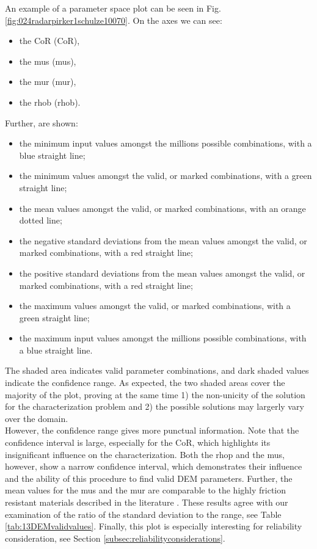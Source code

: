 An example of a parameter space plot can be seen
in Fig. \ref{fig:024radarpirker1schulze10070}.
On the axes we can see:
\begin{itemize}
  \item{the \acl{CoR} (\acs{CoR}),}
  \item{the \acl{mus} (\acs{mus}),}
  \item{the \acl{mur} (\acs{mur}),}  
  \item{the \acl{rhob} (\acs{rhob}).}
\end{itemize}
Further, are shown:
\begin{itemize}
  \item{the minimum input values amongst the millions possible combinations,
  with a blue straight line;}
  \item{the minimum values amongst the valid, or marked combinations, with a
  green straight line;}
  \item{the mean values amongst the valid, or marked combinations, with an
  orange dotted line;}
  \item{the negative standard deviations from the mean values amongst the valid,
  or marked combinations, with a red straight line;}
  \item{the positive standard deviations from the mean values amongst the valid,
  or marked combinations, with a red straight line;}  
  \item{the maximum values amongst the valid, or marked combinations, with a
  green straight line;}
  \item{the maximum input values amongst the millions possible combinations,
  with a blue straight line.}  
\end{itemize}

The shaded area indicates valid parameter combinations, and dark shaded
values indicate the confidence range.
As expected, the two shaded areas cover the majority of the plot, proving at the
same time 1) the non-unicity of the solution for the characterization problem
and 2) the possible solutions may largerly vary over the domain.\\
However, the confidence range gives more punctual information.
Note that the confidence interval is large, 
especially for the \acs{CoR}, which highlights its insignificant influence on the
characterization.
Both the \acs{rhop} and the \acs{mus}, however, show a narrow confidence interval, 
which demonstrates their influence and the ability of this procedure to find
valid \acs{DEM} parameters.
Further, the mean values for the \acs{mus} and the \acs{mur} are
comparable to the highly friction resistant materials described in the literature \cite{RefWorks:175}.
These results agree with our
examination of the ratio of the standard deviation to the range, see Table \ref{tab:13DEMvalidvalues}.
Finally, this plot is especially interesting for reliability consideration, see
Section \ref{subsec:reliabilityconsiderations}.


